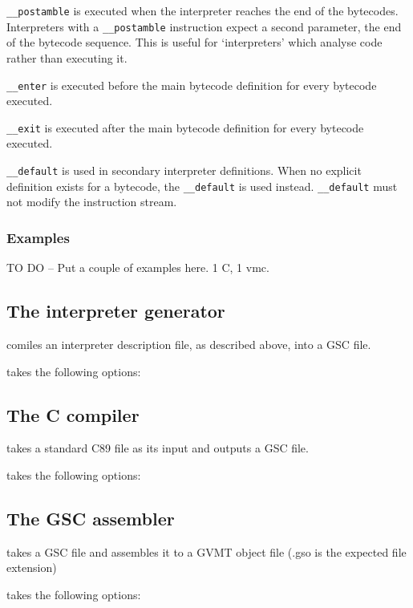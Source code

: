 \verb|__postamble| is executed when the interpreter reaches the end of the bytecodes. Interpreters with a \verb|__postamble| instruction expect a second parameter, the end of the bytecode sequence. This is useful for `interpreters' which analyse code rather than executing it.

\verb|__enter| is executed before the main bytecode definition for every bytecode executed.

\verb|__exit| is executed after the main bytecode definition for every bytecode executed.

\verb|__default| is used in secondary interpreter definitions. When no explicit definition exists for a bytecode, the \verb|__default| is used instead. \verb|__default| must not modify the instruction stream. 

\subsubsection*{Examples}


TO DO -- Put a couple of examples here. 1 C, 1 vmc.



\subsection{The interpreter generator \gvmtic{}\label{sect:gvmtic}}
\gvmtic{} comiles an interpreter description file, as described above, into a GSC file.

\gvmtic{} takes the following options:



\subsection{The C compiler \gvmtc{}\label{sect:gvmtc}}
\gvmtc{} takes a standard C89 file as its input and outputs a GSC file.

\gvmtc{} takes the following options:



\subsection{The GSC assembler \gvmtas{}\label{sect:gvmtas}}
\gvmtas{} takes a GSC file and assembles it to a GVMT object file (.gso is the expected file extension)

\gvmtas{} takes the following options:

